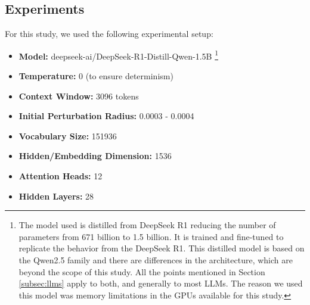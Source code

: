 \documentclass[a4paper,12pt]{article}
\begin{document}







\subsection{Experiments}
\label{subsec:experiments}

For this study, we used the following experimental setup:
\begin{itemize}
    \item \textbf{Model:} deepseek-ai/DeepSeek-R1-Distill-Qwen-1.5B \cite{deepseek2025r1distillqwen1.5b} \footnote{The model used is distilled from DeepSeek R1 reducing the number of parameters from 671 billion to 1.5 billion. It is trained and fine-tuned to replicate the behavior from the DeepSeek R1. This distilled model is based on the Qwen2.5 family and there are differences in the architecture, which are beyond the scope of this study. All the points mentioned in Section \ref{subsec:llms} apply to both, and generally to most LLMs. The reason we used this model was memory limitations in the GPUs available for this study.}
    \item \textbf{Temperature:} 0 (to ensure determinism)
    \item \textbf{Context Window:} 3096 tokens
    \item \textbf{Initial Perturbation Radius:} 0.0003 - 0.0004 %
    \item \textbf{Vocabulary Size:} 151936
    \item \textbf{Hidden/Embedding Dimension:} 1536
    \item \textbf{Attention Heads:} 12
    \item \textbf{Hidden Layers:} 28
\end{itemize}
\end{document}
